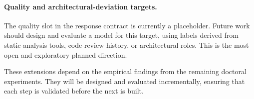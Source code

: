 \paragraph{Quality and architectural-deviation targets.}
The quality slot in the response contract is currently a placeholder. Future
work should design and evaluate a model for this target, using labels derived
from static-analysis tools, code-review history, or architectural roles. This is
the most open and exploratory planned direction.

These extensions depend on the empirical findings from the remaining doctoral
experiments. They will be designed and evaluated incrementally, ensuring that
each step is validated before the next is built.
